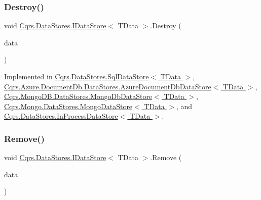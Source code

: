 \subsubsection{\texorpdfstring{Destroy()}{Destroy()}}
{\footnotesize\ttfamily void \hyperlink{interfaceCqrs_1_1DataStores_1_1IDataStore}{Cqrs.\+Data\+Stores.\+I\+Data\+Store}$<$ T\+Data $>$.Destroy (\begin{DoxyParamCaption}\item[{T\+Data}]{data }\end{DoxyParamCaption})}



Implemented in \hyperlink{classCqrs_1_1DataStores_1_1SqlDataStore_a5ec396c9eb202c8de931c1546c721ca3_a5ec396c9eb202c8de931c1546c721ca3}{Cqrs.\+Data\+Stores.\+Sql\+Data\+Store$<$ T\+Data $>$}, \hyperlink{classCqrs_1_1Azure_1_1DocumentDb_1_1DataStores_1_1AzureDocumentDbDataStore_affe39fe57e590555256258fa6c568c29_affe39fe57e590555256258fa6c568c29}{Cqrs.\+Azure.\+Document\+Db.\+Data\+Stores.\+Azure\+Document\+Db\+Data\+Store$<$ T\+Data $>$}, \hyperlink{classCqrs_1_1MongoDB_1_1DataStores_1_1MongoDbDataStore_a4650c780f34e320ba39f312e3b04555d_a4650c780f34e320ba39f312e3b04555d}{Cqrs.\+Mongo\+D\+B.\+Data\+Stores.\+Mongo\+Db\+Data\+Store$<$ T\+Data $>$}, \hyperlink{classCqrs_1_1Mongo_1_1DataStores_1_1MongoDataStore_af97319aef1f0484666d9ea12578b8df9_af97319aef1f0484666d9ea12578b8df9}{Cqrs.\+Mongo.\+Data\+Stores.\+Mongo\+Data\+Store$<$ T\+Data $>$}, and \hyperlink{classCqrs_1_1DataStores_1_1InProcessDataStore_a1fc7a3935f52087f3703b652e77f0b75_a1fc7a3935f52087f3703b652e77f0b75}{Cqrs.\+Data\+Stores.\+In\+Process\+Data\+Store$<$ T\+Data $>$}.

\mbox{\label{interfaceCqrs_1_1DataStores_1_1IDataStore_a7ef540796bbe4257296841590bc23478_a7ef540796bbe4257296841590bc23478}} 
\subsubsection{\texorpdfstring{Remove()}{Remove()}}
{\footnotesize\ttfamily void \hyperlink{interfaceCqrs_1_1DataStores_1_1IDataStore}{Cqrs.\+Data\+Stores.\+I\+Data\+Store}$<$ T\+Data $>$.Remove (\begin{DoxyParamCaption}\item[{T\+Data}]{data }\end{DoxyParamCaption})}




